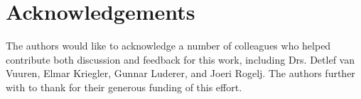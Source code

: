\documentclass[review]{elsarticle}
\begin{document}
 

\newpage




% 
% 
% 


\section*{Acknowledgements}

The authors would like to acknowledge a number of colleagues who helped
contribute both discussion and feedback for this work, including Drs. Detlef van
Vuuren, Elmar Kriegler, Gunnar Luderer, and Joeri Rogelj. The authors further
with to thank  for their generous funding of this effort.

\newpage
\section*{\refname}

\end{document}
